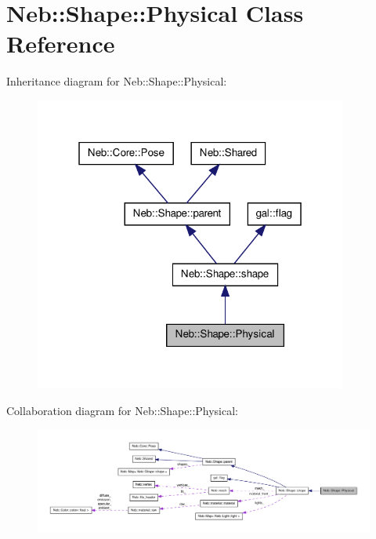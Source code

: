 \hypertarget{classNeb_1_1Shape_1_1Physical}{\section{\-Neb\-:\-:\-Shape\-:\-:\-Physical \-Class \-Reference}
\label{classNeb_1_1Shape_1_1Physical}
}


\-Inheritance diagram for \-Neb\-:\-:\-Shape\-:\-:\-Physical\-:\nopagebreak
\begin{figure}[H]
\begin{center}
\leavevmode
\includegraphics[width=292pt]{classNeb_1_1Shape_1_1Physical__inherit__graph}
\end{center}
\end{figure}


\-Collaboration diagram for \-Neb\-:\-:\-Shape\-:\-:\-Physical\-:\nopagebreak
\begin{figure}[H]
\begin{center}
\leavevmode
\includegraphics[width=350pt]{classNeb_1_1Shape_1_1Physical__coll__graph}
\end{center}
\end{figure}
